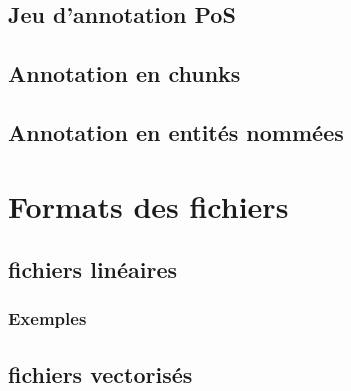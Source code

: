 \documentclass[12pt]{article}
\begin{document}
        \subsection{Jeu d'annotation PoS}
        \label{subsec:tags-pos}
        

        \subsection{Annotation en chunks}
        \label{subsec:tags-chunking}
        

        \subsection{Annotation en entités nommées}
        \label{subsec:tags-ner}
        

        \subsection{\LeFFFFull}
        \label{subsec:lefff}
        
    
    \section{Formats des fichiers}
    \label{sec:file-formats}
    

        \subsection{fichiers linéaires}
        \label{subsec:file-linear}
        

            \subsubsection{Exemples}
            \label{subsubsec:file-linear-examples}
            

        \subsection{fichiers vectorisés}
        \label{subsec:file-vectorised}
        
\end{document}

